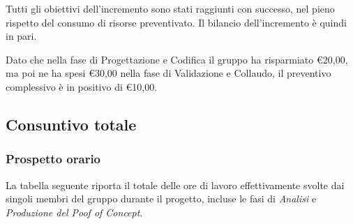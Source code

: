 Tutti gli obiettivi dell’incremento sono stati raggiunti con successo, nel pieno rispetto del consumo di risorse preventivato. Il bilancio dell’incremento è quindi in pari.

Dato che nella fase di Progettazione e Codifica il gruppo ha risparmiato \euro20,00, ma poi ne ha spesi \euro30,00 nella fase di Validazione e Collaudo, il preventivo complessivo è in positivo di \euro10,00.


\pagebreak


\subsection{Consuntivo totale}
\subsubsection{Prospetto orario}

La tabella seguente riporta il totale delle ore di lavoro effettivamente svolte dai singoli membri del gruppo durante il progetto, incluse le fasi di \textit{Analisi} e \textit{Produzione del Poof of Concept}.

